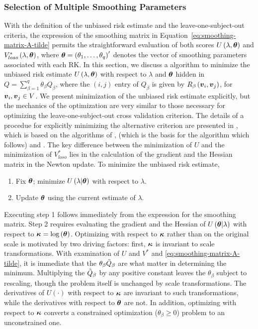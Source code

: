 \subsubsection{Selection of Multiple Smoothing Parameters}

With the definition of the unbiased risk estimate and the leave-one-subject-out criteria, the expression of the smoothing matrix in Equation~\ref{eq:smoothing-matrix-A-tilde} permits the straightforward evaluation of both scores $U\left(\lambda, \mbox{\boldmath $\theta$} \right)$ and $V_{loso}^*\left(\lambda, \mbox{\boldmath $\theta$} \right)$, where $\mbox{\boldmath $\theta$} = \left(\theta_1,\dots, \theta_q\right)'$ denotes the vector of smoothing parameters associated with each RK.  In this section, we discuss a algorithm to minimize the unbiased risk estimate $U\left(\lambda, \mbox{\boldmath $\theta$}\right)$ with respect to $\lambda$ and $\mbox{\boldmath $\theta$}$ hidden in $Q = \sum_{\beta = 1}^q \theta_\beta Q_\beta$, where the $\left(i,j\right)$ entry of $Q_\beta$ is given by $R_\beta\left(\mbox{\boldmath $v$}_i,\mbox{\boldmath $v$}_j\right)$, for $\mbox{\boldmath $v$}_i,\mbox{\boldmath $v$}_j \in V$.  We present minimization of the unbiased risk estimate explicitly, but the mechanics of the optimization are very similar to those necessary for optimizing the leave-one-subject-out cross validation criterion. The details of a procedue for explicitly minimizing the alternative criterion are presented in \cite{xu2012asymptotic}, which is based on the algorithms of \cite{gu1991minimizing}, \cite{kim2004smoothing} (which is the basis for the algorithm which follows) and \cite{wood2004stable}. The key difference between the minimization of $U$ and the minimization of $V^*_{loso}$ lies in the calculation of the gradient and the Hessian matrix in the Newton update. To minimize the unbiased risk estimate,

\begin{enumerate}
\item Fix $\mbox{\boldmath $\theta$}$; minimize $U\left(\lambda \vert \mbox{\boldmath $\theta$}\right)$ with respect to $\lambda$.
\item Update $\mbox{\boldmath $\theta$}$ using the current estimate of $\lambda$.
\end{enumerate}

\noindent
Executing step 1 follows immediately from the expression for the smoothing matrix. Step 2 requires evaluating the gradient and the Hessian of $U\left( \mbox{\boldmath $\theta$} \vert \lambda \right)$ with respect to $\mbox{\boldmath $\kappa$} = \log\left(\mbox{\boldmath $\theta$}\right)$. Optimizing with respect to $\mbox{\boldmath $\kappa$}$ rather than on the original scale is motivated by two driving factors: first, $\mbox{\boldmath $\kappa$}$ is invariant to scale transformations. With examination of $U$ and $V^*$ and \ref{eq:smoothing-matrix-A-tilde}, it is immediate that the $\theta_\beta \tilde{Q}_\beta$ are what matter in determining the minimum. Multiplying the $\tilde{Q}_\beta$ by any positive constant leaves the $\theta_\beta$ subject to rescaling, though the problem itself is unchanged by scale transformations. The derivatives of $U\left(\cdot\right)$ with respect to $\mbox{\boldmath $\kappa$}$ are invariant to such transformations, while the derivatives with respect to $\mbox{\boldmath $\theta$}$ are not. In addition, optimizing with respect to $\mbox{\boldmath $\kappa$}$ converts a constrained optimization ($\theta_\beta \ge 0$) problem to an unconstrained one.

